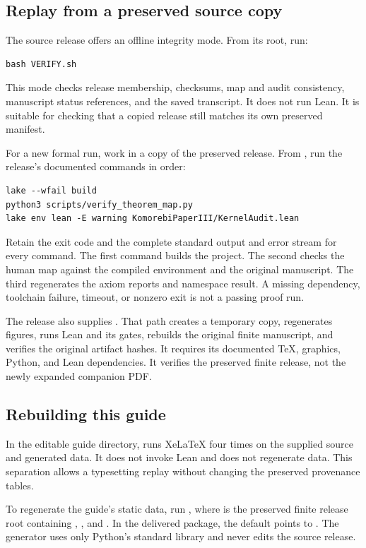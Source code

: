 \subsection{Replay from a preserved source copy}
The source release offers an offline integrity mode. From its root, run:
\begin{Verbatim}[fontsize=\small,frame=leftline,breaklines=true]
bash VERIFY.sh
\end{Verbatim}
This mode checks release membership, checksums, map and audit consistency, manuscript status references, and the saved transcript. It does not run Lean. It is suitable for checking that a copied release still matches its own preserved manifest.

For a new formal run, work in a copy of the preserved release. From , run the release's documented commands in order:
\begin{Verbatim}[fontsize=\small,frame=leftline,breaklines=true]
lake --wfail build
python3 scripts/verify_theorem_map.py
lake env lean -E warning KomorebiPaperIII/KernelAudit.lean
\end{Verbatim}
Retain the exit code and the complete standard output and error stream for every command. The first command builds the project. The second checks the human map against the compiled environment and the original manuscript. The third regenerates the axiom reports and namespace result. A missing dependency, toolchain failure, timeout, or nonzero exit is not a passing proof run.

The release also supplies . That path creates a temporary copy, regenerates figures, runs Lean and its gates, rebuilds the original finite manuscript, and verifies the original artifact hashes. It requires its documented TeX, graphics, Python, and Lean dependencies. It verifies the preserved finite release, not the newly expanded companion PDF.

\subsection{Rebuilding this guide}
In the editable guide directory,  runs XeLaTeX four times on the supplied source and generated data. It does not invoke Lean and does not regenerate data. This separation allows a typesetting replay without changing the preserved provenance tables.

To regenerate the guide's static data, run , where  is the preserved finite release root containing , , and . In the delivered package, the default points to . The generator uses only Python's standard library and never edits the source release.

